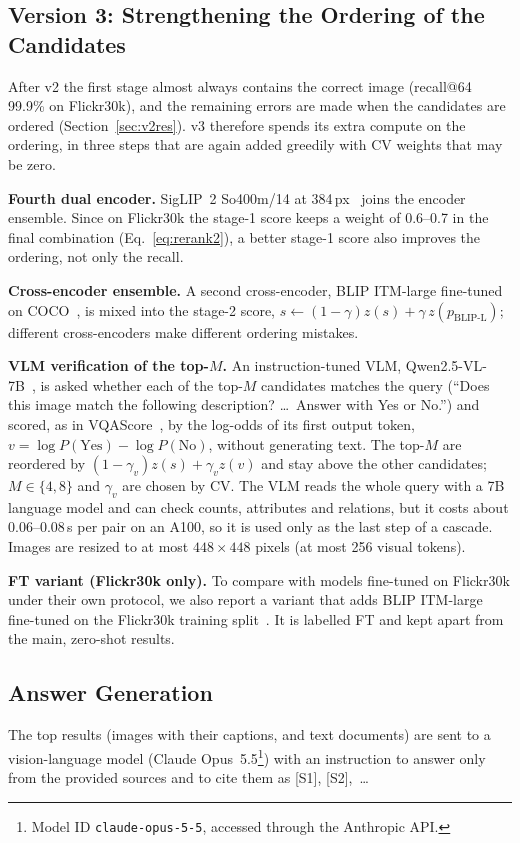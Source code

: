 \documentclass[conference]{IEEEtran}
\begin{document}
\subsection{Version 3: Strengthening the Ordering of the Candidates}
\label{sec:v3}
After v2 the first stage almost always contains the correct image (recall@64 99.9\% on Flickr30k), and the
remaining errors are made when the candidates are ordered (Section~\ref{sec:v2res}). v3 therefore spends its extra
compute on the ordering, in three steps that are again added greedily with CV weights that may be zero.

\textbf{Fourth dual encoder.} SigLIP~2 So400m/14 at 384\,px~\cite{tschannen2025siglip2} joins the encoder ensemble.
Since on Flickr30k the stage-1 score keeps a weight of 0.6--0.7 in the final combination (Eq.~\ref{eq:rerank2}), a
better stage-1 score also improves the ordering, not only the recall.

\textbf{Cross-encoder ensemble.} A second cross-encoder, BLIP ITM-large fine-tuned on COCO~\cite{li2022blip}, is
mixed into the stage-2 score, $s\leftarrow(1-\gamma)z(s)+\gamma\,z(p_\mathrm{BLIP\text{-}L})$; different
cross-encoders make different ordering mistakes.

\textbf{VLM verification of the top-$M$.} An instruction-tuned VLM, Qwen2.5-VL-7B~\cite{bai2025qwen25vl}, is asked
whether each of the top-$M$ candidates matches the query (``Does this image match the following description? \dots\
Answer with Yes or No.'') and scored, as in VQAScore~\cite{lin2024vqascore}, by the log-odds of its first output
token, $v=\log P(\text{Yes})-\log P(\text{No})$, without generating text. The top-$M$ are reordered by
$(1-\gamma_v)z(s)+\gamma_v z(v)$ and stay above the other candidates; $M\in\{4,8\}$ and $\gamma_v$ are chosen by CV.
The VLM reads the whole query with a 7B language model and can check counts, attributes and relations, but it costs
about 0.06--0.08\,s per pair on an A100, so it is used only as the last step of a cascade. Images are resized to at
most $448\times448$ pixels (at most 256 visual tokens).

\textbf{FT variant (Flickr30k only).} To compare with models fine-tuned on Flickr30k under their own protocol, we
also report a variant that adds BLIP ITM-large fine-tuned on the Flickr30k training split~\cite{li2022blip}. It is
labelled FT and kept apart from the main, zero-shot results.

\subsection{Answer Generation}
The top results (images with their captions, and text documents) are sent to a vision-language model
(Claude Opus~5.5\footnote{Model ID \texttt{claude-opus-5-5}, accessed through the Anthropic API.}) with an
instruction to answer only from the provided sources and to cite them as [S1], [S2],~\dots
\end{document}
